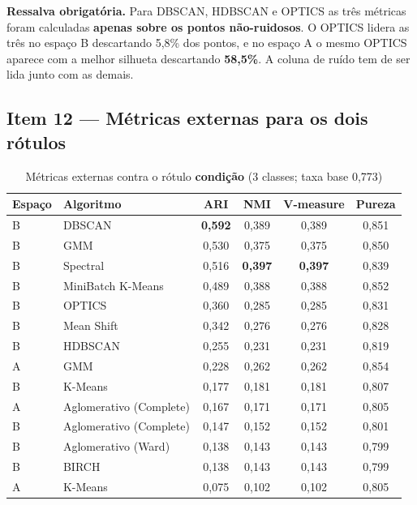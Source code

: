 \documentclass[12pt,a4paper]{article}
\begin{document}
\noindent \textbf{Ressalva obrigatória.} Para DBSCAN, HDBSCAN e OPTICS as três métricas foram calculadas \textbf{apenas sobre os pontos não-ruidosos}. O OPTICS lidera as três no espaço B descartando 5,8\% dos pontos, e no espaço A o mesmo OPTICS aparece com a melhor silhueta descartando \textbf{58,5\%}. A coluna de ruído tem de ser lida junto com as demais.

\subsection{Item 12 --- Métricas externas para os dois rótulos}

\begin{table}[H]
\centering
\caption{Métricas externas contra o rótulo \textbf{condição} (3 classes; taxa base 0,773)}
\label{tab:externas-condicao}
\begin{tabular}{llcccc}
\toprule
Espaço & Algoritmo & ARI & NMI & V-measure & Pureza \\
\midrule
B & DBSCAN                  & \textbf{0{,}592} & 0{,}389 & 0{,}389 & 0{,}851 \\
B & GMM                     & 0{,}530 & 0{,}375 & 0{,}375 & 0{,}850 \\
B & Spectral                & 0{,}516 & \textbf{0{,}397} & \textbf{0{,}397} & 0{,}839 \\
B & MiniBatch K-Means       & 0{,}489 & 0{,}388 & 0{,}388 & 0{,}852 \\
B & OPTICS                  & 0{,}360 & 0{,}285 & 0{,}285 & 0{,}831 \\
B & Mean Shift              & 0{,}342 & 0{,}276 & 0{,}276 & 0{,}828 \\
B & HDBSCAN                 & 0{,}255 & 0{,}231 & 0{,}231 & 0{,}819 \\
A & GMM                     & 0{,}228 & 0{,}262 & 0{,}262 & 0{,}854 \\
B & K-Means                 & 0{,}177 & 0{,}181 & 0{,}181 & 0{,}807 \\
A & Aglomerativo (Complete) & 0{,}167 & 0{,}171 & 0{,}171 & 0{,}805 \\
B & Aglomerativo (Complete) & 0{,}147 & 0{,}152 & 0{,}152 & 0{,}801 \\
B & Aglomerativo (Ward)     & 0{,}138 & 0{,}143 & 0{,}143 & 0{,}799 \\
B & BIRCH                   & 0{,}138 & 0{,}143 & 0{,}143 & 0{,}799 \\
A & K-Means                 & 0{,}075 & 0{,}102 & 0{,}102 & 0{,}805 \\

\end{tabular}
\end{table}
\end{document}
